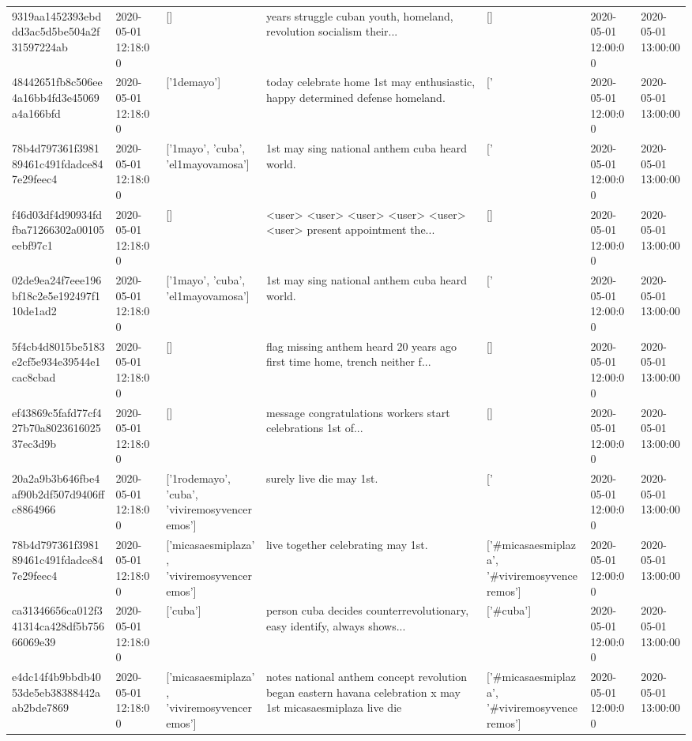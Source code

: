 \begin{tabular}{lllllll}
9319aa1452393ebddd3ac5d5be504a2f31597224ab & 2020-05-01 12:18:00 & [] & years struggle cuban youth, homeland, revolution socialism their... & [] & 2020-05-01 12:00:00 & 2020-05-01 13:00:00 \\
48442651fb8c506ee4a16bb4fd3e45069a4a166bfd & 2020-05-01 12:18:00 & ['1demayo'] & today celebrate home 1st may enthusiastic, happy determined defense homeland. & ['#1demayo'] & 2020-05-01 12:00:00 & 2020-05-01 13:00:00 \\
78b4d797361f398189461c491fdadce847e29feec4 & 2020-05-01 12:18:00 & ['1mayo', 'cuba', 'el1mayovamosa'] & 1st may sing national anthem cuba heard world. & ['#1mayo', '#cuba', '#el1mayovamosa'] & 2020-05-01 12:00:00 & 2020-05-01 13:00:00 \\
f46d03df4d90934fdfba71266302a00105eebf97c1 & 2020-05-01 12:18:00 & [] & <user> <user> <user> <user> <user> <user> present appointment the... & [] & 2020-05-01 12:00:00 & 2020-05-01 13:00:00 \\
02de9ea24f7eee196bf18c2e5e192497f110de1ad2 & 2020-05-01 12:18:00 & ['1mayo', 'cuba', 'el1mayovamosa'] & 1st may sing national anthem cuba heard world. & ['#1mayo', '#cuba', '#el1mayovamosa'] & 2020-05-01 12:00:00 & 2020-05-01 13:00:00 \\
5f4cb4d8015be5183e2cf5e934e39544e1cac8cbad & 2020-05-01 12:18:00 & [] & flag missing anthem heard 20 years ago first time home, trench neither f... & [] & 2020-05-01 12:00:00 & 2020-05-01 13:00:00 \\
ef43869c5fafd77cf427b70a802361602537ec3d9b & 2020-05-01 12:18:00 & [] & message congratulations workers start celebrations 1st of... & [] & 2020-05-01 12:00:00 & 2020-05-01 13:00:00 \\
20a2a9b3b646fbe4af90b2df507d9406ffc8864966 & 2020-05-01 12:18:00 & ['1rodemayo', 'cuba', 'viviremosyvenceremos'] & surely live die may 1st. & ['#1rodemayo', '#cuba', '#viviremosyvenceremos'] & 2020-05-01 12:00:00 & 2020-05-01 13:00:00 \\
78b4d797361f398189461c491fdadce847e29feec4 & 2020-05-01 12:18:00 & ['micasaesmiplaza', 'viviremosyvenceremos'] & live together celebrating may 1st. & ['#micasaesmiplaza', '#viviremosyvenceremos'] & 2020-05-01 12:00:00 & 2020-05-01 13:00:00 \\
ca31346656ca012f341314ca428df5b75666069e39 & 2020-05-01 12:18:00 & ['cuba'] & person cuba decides counterrevolutionary, easy identify, always shows... & ['#cuba'] & 2020-05-01 12:00:00 & 2020-05-01 13:00:00 \\
e4dc14f4b9bbdb4053de5eb38388442aab2bde7869 & 2020-05-01 12:18:00 & ['micasaesmiplaza', 'viviremosyvenceremos'] & notes national anthem concept revolution began eastern havana celebration x may 1st micasaesmiplaza live die & ['#micasaesmiplaza', '#viviremosyvenceremos'] & 2020-05-01 12:00:00 & 2020-05-01 13:00:00 \\

\end{tabular}
